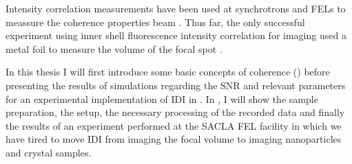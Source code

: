 Intensity correlation measurements have been used at synchrotrons and FELs to meassure the coherence properties beam \cite{yabashi2002,singer2013,inoue2019,gorobtsov2018}. Thus far, the only successful experiment using inner shell fluorescence intensity correlation for imaging used a metal foil to measure the volume of the focal spot \cite{nakumura2020}.


In this thesis I will first introduce some basic concepts of coherence () before presenting the results of simulations regarding the SNR and relevant parameters for an experimental implementation of IDI in . In , I will show the sample preparation, the setup, the necessary processing of the recorded data and finally the results of an experiment performed at the SACLA FEL facility in which we have tired to move IDI from imaging the focal volume to imaging nanoparticles and crystal samples.

\cleardoublepage
